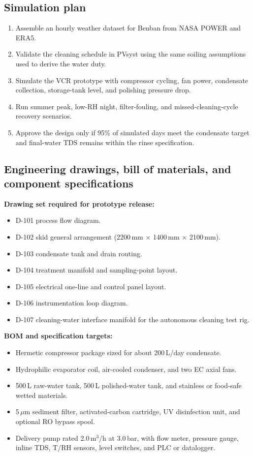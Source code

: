 \documentclass[11pt,a4paper]{article}
\begin{document}
\subsection{Simulation plan}
\begin{enumerate}[leftmargin=*]
  \item Assemble an hourly weather dataset for Benban from NASA POWER and ERA5.
  \item Validate the cleaning schedule in PVsyst using the same soiling assumptions used to derive the water duty.
  \item Simulate the VCR prototype with compressor cycling, fan power, condensate collection, storage-tank level, and polishing pressure drop.
  \item Run summer peak, low-RH night, filter-fouling, and missed-cleaning-cycle recovery scenarios.
  \item Approve the design only if 95\% of simulated days meet the condensate target and final-water TDS remains within the rinse specification.
\end{enumerate}

\subsection{Engineering drawings, bill of materials, and component specifications}
\textbf{Drawing set required for prototype release:}
\begin{itemize}[leftmargin=*]
  \item D-101 process flow diagram.
  \item D-102 skid general arrangement (2200\,mm $\times$ 1400\,mm $\times$ 2100\,mm).
  \item D-103 condensate tank and drain routing.
  \item D-104 treatment manifold and sampling-point layout.
  \item D-105 electrical one-line and control panel layout.
  \item D-106 instrumentation loop diagram.
  \item D-107 cleaning-water interface manifold for the autonomous cleaning test rig.
\end{itemize}

\textbf{BOM and specification targets:}
\begin{itemize}[leftmargin=*]
  \item Hermetic compressor package sized for about 200\,L/day condensate.
  \item Hydrophilic evaporator coil, air-cooled condenser, and two EC axial fans.
  \item 500\,L raw-water tank, 500\,L polished-water tank, and stainless or food-safe wetted materials.
  \item 5\,$\mu$m sediment filter, activated-carbon cartridge, UV disinfection unit, and optional RO bypass spool.
  \item Delivery pump rated 2.0\,m$^3$/h at 3.0\,bar, with flow meter, pressure gauge, inline TDS, T/RH sensors, level switches, and PLC or datalogger.
\end{itemize}
\end{document}
